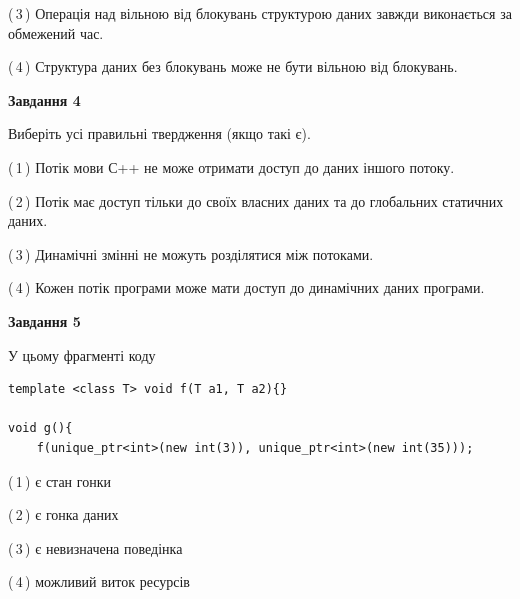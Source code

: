 \documentclass[12pt, ukrainian]{article}
\begin{document}
\begin {large}
{(\,3\,) Операція над вільною від блокувань структурою даних завжди виконається за обмежений час.%

(\,4\,) Структура даних без блокувань може не бути вільною від блокувань.%



\begin{center}
\textbf{Завдання 4}
\end{center}
Виберіть усі правильні твердження (якщо такі є).\par
\vspace{2mm}

(\,1\,) Потік мови С++ не може отримати доступ до даних іншого потоку.%

(\,2\,) Потік має доступ тільки до своїх власних даних та до глобальних статичних даних.%

(\,3\,) Динамічні змінні не можуть розділятися між потоками.%

(\,4\,) Кожен потік програми може мати доступ до динамічних даних програми.%



\begin{center}
\textbf{Завдання 5}
\end{center}
У цьому фрагменті коду
\begin{verbatim}
template <class T> void f(T a1, T a2){}

void g(){
    f(unique_ptr<int>(new int(3)), unique_ptr<int>(new int(35)));
\end{verbatim}

(\,1\,) є стан гонки%

(\,2\,) є гонка даних%

(\,3\,) є невизначена поведінка%

(\,4\,) можливий виток ресурсів%


}
\end {large}
\end{document}
